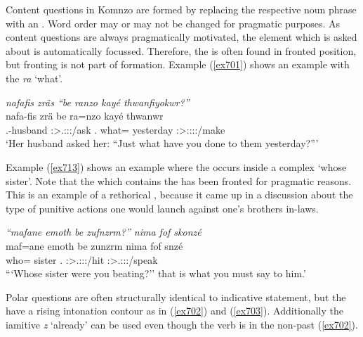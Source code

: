 Content questions in Komnzo are formed by replacing the respective noun phrase with an . Word order may or may not be changed for pragmatic purposes. As content questions are always pragmatically motivated, the element which is asked about is automatically focussed. Therefore, the  is often found in fronted position, but fronting is not part of  formation. Example (\ref{ex701}) shows an example with the  \emph{ra} `what'.

\begin{exe}
	\ex \emph{nafafis zräs ``be ranzo kayé thwanfiyokwr?''}\\
	\gll nafa-fis zrä be ra=nzo kayé thwanwr\\
	\Third.\Poss-husband \Stsg:\Sbj>\Tsg.\F:\Obj:\Irr:\Pfv/ask \Ssg.\Erg{} what=\Only{} yesterday \Stsg:\Sbj>\Stpl:\Obj:\Rpst:\Ipfv:\Venit/make\\
	\trans `Her husband asked her: ``Just what have you done to them yesterday?'''\\
	\label{ex701}
\end{exe}

Example (\ref{ex713}) shows an example where the  occurs inside a complex  `whose sister'. Note that the  which contains the  has been fronted for pragmatic reasons. This is an example of a rethorical , because it came up in a discussion about the type of punitive actions one would launch against one's brothers in-laws.

\begin{exe}
	\ex \emph{``mafane emoth be zufnzrm?'' nima fof skonzé}\\
	\gll maf=ane emoth be zunzrm nima fof snzé\\
	who=\Poss{} sister \Ssg.\Erg{} \Stsg:\Sbj>\Tsg.\F:\Obj:\Pst:\Dur/hit \Quot{} \Emph{} \Ssg:\Sbj>\Tsg.\Masc:\Obj:\Imp:\Ipfv/speak\\
	\trans ```Whose sister were you beating?'' that is what you must say to him.'\\
	\label{ex713}
\end{exe}

Polar questions are often structurally identical to indicative statement, but the have a rising intonation contour as in (\ref{ex702}) and (\ref{ex703}).  Additionally the iamitive  \emph{z} `already' can be used even though the verb is in the non-past (\ref{ex702}).

